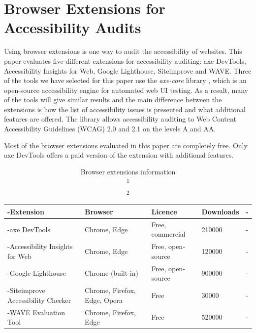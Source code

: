 
\chapter{Browser Extensions for Accessibility Audits}
\label{chap:extensions}

Using browser extensions is one way to audit the accessibility of
websites.  This paper evaluates five different extensions for
accessibility auditing: axe DevTools, Accessibility Insights for Web,
Google Lighthouse, Siteimprove and WAVE.  Three of the tools we have
selected for this paper use the \emph{axe-core} library
\parencite{axe_core}, which is an open-source accessibility engine for
automated web UI testing.  As a result, many of the tools will give
similar results and the main difference between the extensions is how
the list of accessibility issues is presented and what additional
features are offered.  The library allows accessibility auditing to
Web Content Accessibility Guidelines (WCAG) 2.0 and 2.1 on the levels
A and AA.

Most of the browser extensions evaluated in this paper are completely free.
Only axe DevTools offers a paid version of the extension with additional features.

\begin{table}[tp]
\tablestretch
{}
\centering
\begin{tabularx}{\linewidth}
{>{\kern-\tabcolsep}lllXX<{\kern-\tabcolsep}}
\toprule
\textbf{Extension} & \textbf{Browser} & \textbf{Licence} & \textbf{Downloads\footnotemark}
\\
\midrule
axe DevTools & Chrome, Edge & Free, commercial & 210000 \\
%
Accessibility Insights for Web & Chrome, Edge & Free, open-source & 120000 \\
%
Google Lighthouse & Chrome (built-in) & Free, open-source & 900000\footnotemark \\
%
Siteimprove Accessibility Checker & Chrome, Firefox, Edge, Opera & Free & 30000 \\
%
WAVE Evaluation Tool & Chrome, Firefox, Edge & Free & 520000 \\
\bottomrule
\end{tabularx}
\caption[Browser Extensions Information]
{
Browser extensions information \\
\textsuperscript{1} \\
\textsuperscript{2}
}
\label{tab:browser-extensions-info}
\end{table}

